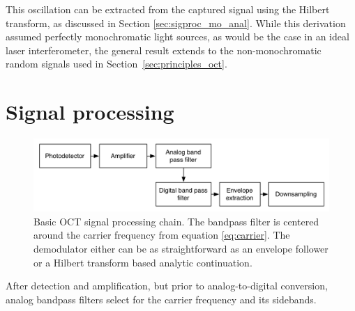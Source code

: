 This oscillation can be extracted from the captured signal using the Hilbert transform, as discussed in Section \ref{sec:sigproc_mo_anal}. While this derivation assumed perfectly monochromatic light sources, as would be the case in an ideal laser interferometer, the general result extends to the non-monochromatic random signals used in Section~\ref{sec:principles_oct}.

\section{Signal processing}


\begin{figure}[h!]
  \centering
  \includegraphics[width=1.0\textwidth]{Images/background/basic_dsp.png}
\caption[Basic OCT signal processing chain.]{Basic OCT signal processing chain. The bandpass filter is centered around the carrier frequency from equation \ref{eq:carrier}. The demodulator either can be as straightforward as an envelope follower or a Hilbert transform based analytic continuation.}
\end{figure}

After detection and amplification, but prior to analog-to-digital conversion, analog bandpass filters select for the carrier frequency and its sidebands.

